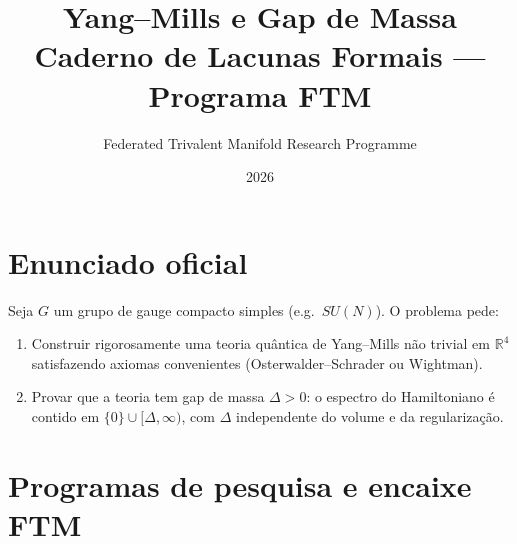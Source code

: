 \documentclass[11pt,a4paper]{article}
\title{Yang–Mills e Gap de Massa\\[4pt]
       \large Caderno de Lacunas Formais — Programa FTM}
\author{Federated Trivalent Manifold Research Programme}
\date{2026}
\begin{document}
\maketitle
\tableofcontents
\bigskip

\section{Enunciado oficial}

\begin{definition}
Seja $G$ um grupo de gauge compacto simples (e.g.\ $SU(N)$).
O problema pede:
\begin{enumerate}[leftmargin=2em]
  \item Construir rigorosamente uma teoria quântica de Yang–Mills
    não trivial em $\mathbb R^4$ satisfazendo axiomas convenientes
    (Osterwalder–Schrader ou Wightman).
  \item Provar que a teoria tem gap de massa $\Delta>0$:
    o espectro do Hamiltoniano é contido em $\{0\}\cup[\Delta,\infty)$,
    com $\Delta$ independente do volume e da regularização.
\end{enumerate}
\end{definition}

\bigskip

\section{Programas de pesquisa e encaixe FTM}
\end{document}
